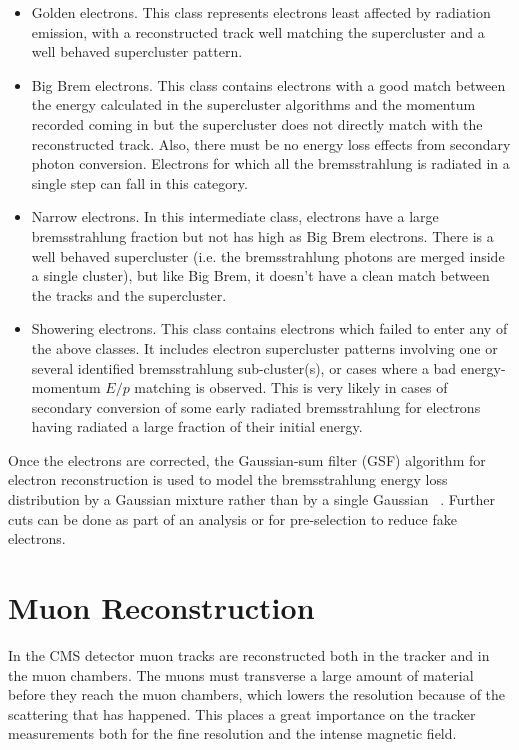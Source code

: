 \begin{itemize}
\item
  Golden electrons. This class represents electrons least affected by radiation emission, with a reconstructed track well matching the supercluster and a well behaved supercluster pattern. 
\item
  Big Brem electrons. This class contains electrons with a good match between the energy calculated in the supercluster algorithms and the momentum recorded coming in but the supercluster does not directly match with the reconstructed track.  Also, there must be no energy loss effects from secondary photon conversion. Electrons for which all the bremsstrahlung is radiated in a single step can fall in this category.
\item
  Narrow electrons. In this intermediate class, electrons have a large bremsstrahlung fraction but not has high as Big Brem electrons.  There is a well behaved supercluster (i.e. the bremsstrahlung photons are merged inside a single cluster), but like Big Brem, it doesn't have a clean match between the tracks and the supercluster.
\item
  Showering electrons. This class contains electrons which failed to enter any of the above classes. It includes electron supercluster patterns involving one or several identified bremsstrahlung sub-cluster(s), or cases where a bad energy-momentum $E/p$ matching is observed. This is very likely in cases of secondary conversion of some early radiated bremsstrahlung for electrons having radiated a large fraction of their initial energy.
\end{itemize}

Once the electrons are corrected, the Gaussian-sum filter (GSF) algorithm for electron reconstruction is used to model the bremsstrahlung energy loss distribution by a Gaussian mixture rather than by a single Gaussian ~\cite{GSF_at_CMS}. Further cuts can be done as part of an analysis or for pre-selection to reduce fake electrons.

\section{Muon Reconstruction}

In the CMS detector muon tracks are reconstructed both in the tracker and in the muon chambers.  The muons must transverse a large amount of material before they reach the muon chambers, which lowers the resolution because of the scattering that has happened. This places a great importance on the tracker measurements both for the fine resolution and the intense magnetic field. 

